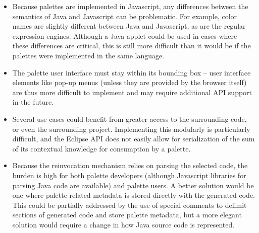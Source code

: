 \documentclass[10pt, conference, compsocconf]{IEEEtran}
\begin{document}
\begin{itemize}
\item Because palettes are implemented in Javascript, any differences between the semantics of Java and Javascript can be problematic. For example, color names are slightly different between Java and Javascript, as are the regular expression engines. Although a Java applet could be used in cases where these differences are critical, this is still more difficult than it would be if the palettes were implemented in the same language.
\item The palette user interface must stay within its bounding box -- user interface elements like pop-up menus (unless they are provided by the browser itself) are thus more difficult to implement and may require additional API support in the future.
\item Several use cases could benefit from greater access to the surrounding code, or even the surrounding project. Implementing this modularly is particularly difficult, and the Eclipse API does not easily allow for  serialization of the sum of its contextual knowledge for consumption by a palette.
\item Because the reinvocation mechanism relies on parsing the selected code, the burden is high for both palette developers (although Javascript libraries for parsing Java code are available) and palette users. A better solution would be one where palette-related metadata is stored directly with the generated code. This could be partially addressed by the use of special comments to delimit sections of generated code and store palette metadata, but a more elegant solution would require a  change in how Java source code is represented.
\end{itemize}
\end{document}
